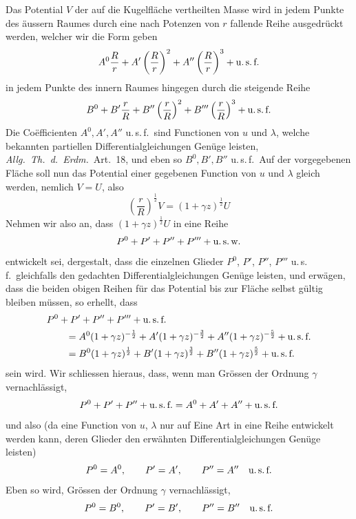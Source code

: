 Das Potential $V$ der auf die Kugelfläche vertheilten Masse wird in jedem Punkte des äussern Raumes durch eine nach Potenzen von $r$ fallende Reihe ausgedrückt werden, welcher wir die Form geben
\[
A^0\frac Rr+A'\left(\frac Rr\right)^2+A''\left(\frac Rr\right)^3+\text{u.\,s.\,f.}
\]
in jedem Punkte des innern Raumes hingegen durch die steigende Reihe
\[
B^0+B'\frac rR+B''\left(\frac rR\right)^2+B'''\left(\frac rR\right)^3+\text{u.\,s.\,f.}
\]
Die Coëfficienten $A^0,A',A''$ u.\,s.\,f.\ sind Functionen von $u$ und $\lambda$, welche bekannten partiellen Differentialgleichungen Genüge leisten, \textit{Allg.\ Th.\ d.\ Erdm.}\ Art.\ 18, und eben so $B^0,B',B''$ u.\,s.\,f.\ Auf der vorgegebenen Fläche soll nun das Potential einer gegebenen Function von $u$ und $\lambda$ gleich werden, nemlich $V=U$, also
\[
\left(\frac rR\right)^{\frac12}V=(1+\gamma z)^{\frac12}U
\]
Nehmen wir also an, dass $(1+\gamma z)^{\frac12}U$ in eine Reihe
\[
P^0+P'+P''+P'''+\text{u.\,s.\,w.}
\]
entwickelt sei, dergestalt, dass die einzelnen Glieder $P^0$, $P'$, $P''$, $P'''$ u.\,s.\,f.\ gleichfalls den gedachten Differentialgleichungen Genüge leisten, und erwägen, dass die beiden obigen Reihen für das Potential bis zur Fläche selbst gültig bleiben müssen, so erhellt, dass
\[
\begin{aligned}
&P^0+P'+P''+P'''+\text{u.\,s.\,f.}\\
&\qquad=A^0(1+\gamma z)^{-\frac12}+A'(1+\gamma z)^{-\frac32}+A''(1+\gamma z)^{-\frac52}+\text{u.\,s.\,f.}\\
&\qquad=B^0(1+\gamma z)^{\frac12}+B'(1+\gamma z)^{\frac32}+B''(1+\gamma z)^{\frac52}+\text{u.\,s.\,f.}
\end{aligned}
\]
sein wird. Wir schliessen hieraus, dass, wenn man Grössen der Ordnung $\gamma$ vernachlässigt,
\[
P^0+P'+P''+\text{u.\,s.\,f.}=A^0+A'+A''+\text{u.\,s.\,f.}
\]
und also (da eine Function von $u$, $\lambda$ nur auf Eine Art in eine Reihe entwickelt werden kann, deren Glieder den erwähnten Differentialgleichungen Genüge leisten)
\[
P^0=A^0,\qquad P'=A',\qquad P''=A''\quad\text{u.\,s.\,f.}
\]
Eben so wird, Grössen der Ordnung $\gamma$ vernachlässigt,
\[
P^0=B^0,\qquad P'=B',\qquad P''=B''\quad\text{u.\,s.\,f.}
\]


